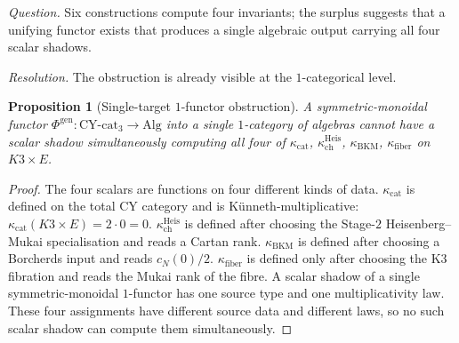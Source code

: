 \documentclass[11pt]{article}
\newtheorem{proposition}[theorem]{Proposition}
\begin{document}
\emph{Question.} Six constructions compute four invariants;
the surplus suggests that a unifying functor exists that produces
a single algebraic output carrying all four scalar shadows.

\emph{Resolution.} The obstruction is already visible at the
$1$-categorical level.

\begin{proposition}[Single-target $1$-functor obstruction]
\label{prop:no-single-functor}
A symmetric-monoidal functor
$\Phi^{\mathrm{gen}} \colon \mathrm{CY\text{-}cat}_3 \to
\mathrm{Alg}$ into a single $1$-category of algebras cannot have a
scalar shadow simultaneously computing all four of
$\kappa_{\mathrm{cat}}$, $\kappa_{\mathrm{ch}}^{\mathrm{Heis}}$,
$\kappa_{\mathrm{BKM}}$, $\kappa_{\mathrm{fiber}}$ on $K3 \times E$.
\end{proposition}

\begin{proof}
The four scalars are functions on four different kinds of data.
$\kappa_{\mathrm{cat}}$ is defined on the total CY category and is
K\"unneth-multiplicative:
$\kappa_{\mathrm{cat}}(K3\times E)=2\cdot 0=0$.
$\kappa_{\mathrm{ch}}^{\mathrm{Heis}}$ is defined after choosing the
Stage-$2$ Heisenberg--Mukai specialisation and reads a Cartan rank.
$\kappa_{\mathrm{BKM}}$ is defined after choosing a Borcherds input
and reads $c_N(0)/2$. $\kappa_{\mathrm{fiber}}$ is defined only
after choosing the K3 fibration and reads the Mukai rank of the
fibre. A scalar shadow of a single symmetric-monoidal $1$-functor has
one source type and one multiplicativity law. These four assignments
have different source data and different laws, so no such scalar
shadow can compute them simultaneously.
\end{proof}
\end{document}
